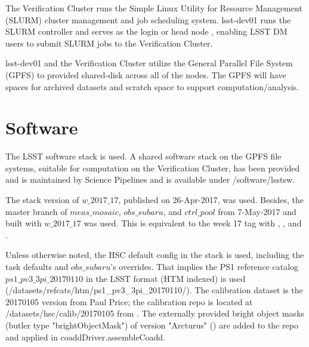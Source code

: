 \documentclass[DM,authoryear,toc]{lsstdoc}
\begin{document}
The Verification Cluster runs the Simple Linux Utility for Resource Management (SLURM) cluster management and job scheduling system. lsst-dev01 runs the SLURM controller and serves as the login or head node , enabling LSST DM users to submit SLURM jobs to the Verification Cluster.

lsst-dev01 and the Verification Cluster utilize the General Parallel File System (GPFS) to provided shared-disk across all of the nodes. The GPFS will have spaces for archived datasets and scratch space to support computation/analysis.



\section{Software}

The LSST software stack is used. A shared software stack on the GPFS file systems, suitable for computation on the Verification Cluster, has been provided and is maintained by Science Pipelines and is available under /software/lsstsw.

The stack version of $w{\_}2017{\_}17$, published on 26-Apr-2017, was used.
Besides, the master branch of $meas{\_}mosaic$, $obs{\_}subaru$, and $ctrl{\_}pool$ from 7-May-2017 and built with $w{\_}2017{\_}17$ was used.
This is equivalent to the week 17 tag with , , and .

Unless otherwise noted, the HSC default config in the stack is used, including the task defaults and $obs{\_}subaru$'s overrides.
That implies the PS1 reference catalog $ps1{\_}pv3{\_}3pi{\_}20170110$ in the LSST format (HTM indexed) is used (/datasets/refcats/htm/ps1{\_}pv3{\_}3pi{\_}20170110/).
The calibration dataset is the 20170105 version from Paul Price; the calibration repo is located at /datasets/hsc/calib/20170105 from .
The externally provided bright object masks (butler type "brightObjectMask") of version "Arcturus" () are added to the repo and applied in coaddDriver.assembleCoadd.
\end{document}
